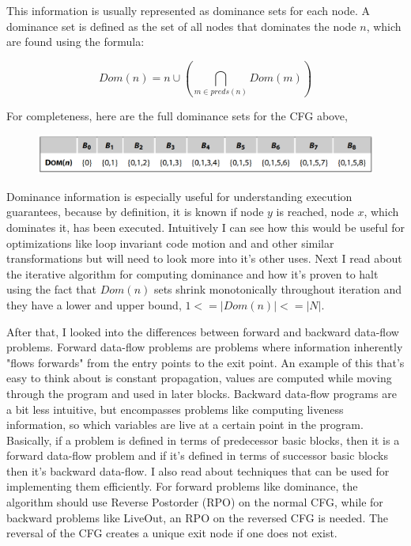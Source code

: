 \documentclass[11pt, a4paper, titlepage]{article}
\begin{document}
This information is usually represented as dominance sets for each node. A dominance set is defined as the set of all nodes that dominates the node $n$, which are found using the formula:

\[Dom(n)={n} \cup (\bigcap_{m \in preds(n)} Dom(m))\]

For completeness, here are the full dominance sets for the CFG above,

\begin{figure}[H]
  \centering
  \includegraphics[scale=0.3]{images/r2.png}
\end{figure}

Dominance information is especially useful for understanding execution guarantees, because by definition, it is known if node $y$ is reached, node $x$, which dominates it, has been executed.
Intuitively I can see how this would be useful for optimizations like loop invariant code motion and and other similar transformations but will need to look more into it's other uses.
Next I read about the iterative algorithm for computing dominance and how it's proven to halt using the fact that $Dom(n)$ sets shrink monotonically throughout iteration and they have a lower and upper bound, $1 <= |Dom(n)| <= |N|$. 

After that, I looked into the differences between forward and backward data-flow problems. Forward data-flow problems are problems where information inherently "flows forwards" from the entry points to the exit point. An example of this that's easy to think about is constant propagation, values are computed while moving through the program and used in later blocks. Backward data-flow programs are a bit less intuitive, but encompasses problems like computing liveness information, so which variables are live at a certain point in the program. Basically, if a problem is defined in terms of predecessor basic blocks, then it is a forward data-flow problem and if it's defined in terms of successor basic blocks then it's backward data-flow. I also read about techniques that can be used for implementing them efficiently. For forward problems like dominance, the algorithm should use Reverse Postorder (RPO) on the normal CFG, while for backward problems like LiveOut, an RPO on the reversed CFG is needed. The reversal of the CFG creates a unique exit node if one does not exist.
\end{document}
